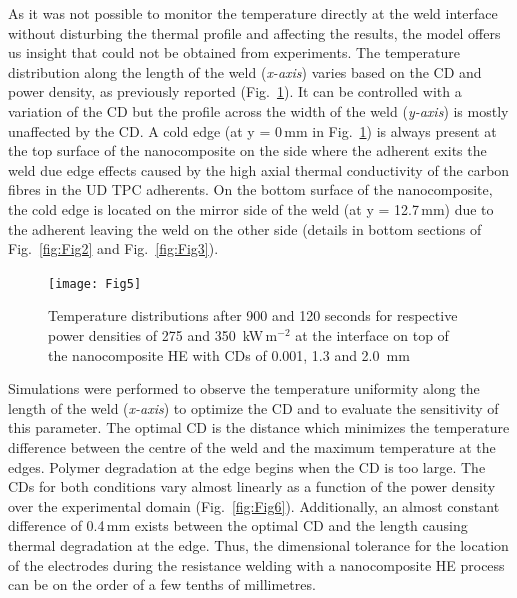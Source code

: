 \documentclass[review,times,sagev,doublespace]{sagej}
\begin{document}
As it was not possible to monitor the temperature directly at the weld interface without disturbing the thermal profile and affecting the results, the model offers us insight that could not be obtained from experiments. 
The temperature distribution along the length of the weld (\textit{x-axis}) varies based on the {CD} and power density, as previously reported \cite{Talbot2013} (\mbox{Fig.~\ref{fig:Fig5}}). 
It can be controlled with a variation of the {CD} but the profile across the width of the weld (\textit{y-axis}) is mostly unaffected by the {CD}. 
A cold edge (at y = \mbox{0\,mm} in \mbox{Fig.~\ref{fig:Fig5}}) is always present at the top surface of the nanocomposite on the side where the adherent exits the weld due edge effects caused by the high axial thermal conductivity of the carbon fibres in the UD TPC adherents. 
On the bottom surface of the nanocomposite, the cold edge is located on the mirror side of the weld (at y = \mbox{12.7\,mm}) due to the adherent leaving the weld on the other side (details in bottom sections of \mbox{Fig.~\ref{fig:Fig2}} and \mbox{Fig.~\ref{fig:Fig3}}). 

\begin{figure}[ht]
	\center
	\texttt{[image: Fig5]}
	\caption{Temperature distributions after 900 and 120 seconds for respective power densities of 275 and 350~kW\,m$^{-2}$ at the interface on top of the nanocomposite HE with {CDs} of 0.001, 1.3 and 2.0~mm \cite{Brassard2019b}}
	\label{fig:Fig5}
\end{figure} 

Simulations were performed to observe the temperature uniformity along the length of the weld (\textit{x-axis}) to optimize the {CD} and to evaluate the sensitivity of this parameter. 
The optimal {CD} is the distance which minimizes the temperature difference between the centre of the weld and the maximum temperature at the edges. 
Polymer degradation at the edge begins when the {CD} is too large. 
The {CDs} for both conditions vary almost linearly as a function of the power density over the experimental domain (\mbox{Fig.~\ref{fig:Fig6}}). 
Additionally, an almost constant difference of \mbox{0.4\,mm} exists between the optimal {CD} and the length causing thermal degradation at the edge. 
Thus, the dimensional tolerance for the location of the electrodes during the resistance welding with a nanocomposite HE process can be on the order of a few tenths of millimetres. 
\end{document}
